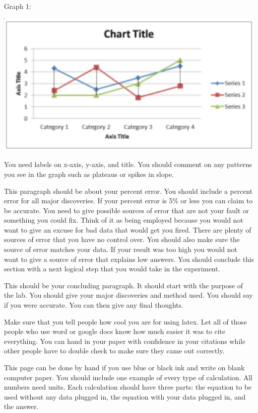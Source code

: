\documentclass{report}
\begin{document}
\begin{flushleft}
Graph 1: 
\end{flushleft}
\begin{center}
\includegraphics[scale=.7]{graph}
\end{center}
\begin{flushleft}
You need labels on x-axis, y-axis, and title. You should comment on any patterns you see in the graph such as plateaus or spikes in slope.
\end{flushleft}
\hspace{6ex}This paragraph should be about your percent error. You should include a percent error for all major discoveries. If your percent error is 5\% or less you can claim to be accurate. You need to give possible sources of error that are not your fault or something you could fix. Think of it as being employed because you would not want to give an excuse for bad data that would get you fired. There are plenty of sources of error that you have no control over. You should also make sure the source of error matches your data. If your result was too high you would not want to give a source of error that explains low answers.  You should conclude this section with a next logical step that you would take in the experiment.
\begin{flushleft}
\hspace{6ex}This should be your concluding paragraph. It should start with the purpose of the lab. You should give your major discoveries and method used. You should say if you were accurate. You can then give any final thoughts.
\end{flushleft}
\printbibliography
\begin{flushleft}
\hspace{6ex}Make sure that you tell people how cool you are for using latex. Let all of those people who use word or google docs know how much easier it was to cite everything. You can hand in your paper with confidence in your citations while other people have to double check to make sure they came out correctly.
\end{flushleft}
\newpage 
\begin{flushleft}
This page can be done by hand if you use blue or black ink and write on blank computer paper. You should include one example of every type of calculation. All numbers need units. Each calculation should have three parts: the equation to be used without any data plugged in, the equation with your data plugged in, and the answer.
\end{flushleft}
\end{document}
